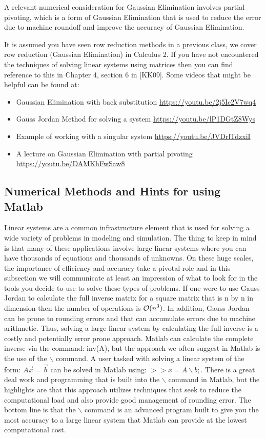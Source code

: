 \documentclass[twoside]{article}
\renewcommand{\cite}[1]{[#1]}
\def\ds{\displaystyle}
\begin{document}
A relevant numerical consideration for Gaussian Elimination involves partial pivoting, which is a form of Gaussian Elimination that is used to reduce the error due to machine roundoff and improve the accuracy of Gaussian Elimination. 

It is assumed you have seen row reduction methods in a previous class, we cover row reduction (Gaussian Elimination) in Calculus 2. If you have not encountered the techniques of solving linear systems using matrices then you can find reference to this in Chapter 4, section 6 in \cite{KK09}. Some videos that might be helpful can be found at:

\begin{itemize}
\item Gaussian Elimination with back substitution \href{https://youtu.be/2j5Ic2V7wq4}{https://youtu.be/2j5Ic2V7wq4}
\item Gauss Jordan Method for solving a system \href{ https://youtu.be/lP1DGtZ8Wys}{ https://youtu.be/lP1DGtZ8Wys}
\item Example of working with a singular system \href{https://youtu.be/JVDrlTdzxiI}{https://youtu.be/JVDrlTdzxiI}
\item A lecture on Gaussian Elimination with partial pivoting \href{https://youtu.be/DAMKhFwSaw8}{https://youtu.be/DAMKhFwSaw8}
\end{itemize}

\subsection{Numerical Methods and Hints for using Matlab}
Linear systems are a common infrastructure element that is used for solving a wide variety of problems in modeling and simulation. The thing to keep in mind is that many of these applications involve large linear systems where you can have thousands of equations and thousands of unknowns. On these huge scales, the importance of efficiency and accuracy take a pivotal role and in this subsection we will communicate at least an impression of what to look for in the tools you decide to use to solve these types of problems. If one were to use Gauss-Jordan to calculate the full inverse matrix for a square matrix that is n by n in dimension then the number of operations is $\ds {\cal O}(n^3)$. In addition, Gauss-Jordan can be prone to rounding errors and that can accumulate errors due to machine arithmetic. Thus, solving a large linear system by calculating the full inverse is a costly and potentially error prone approach. Matlab can calculate the complete inverse  via the command: inv(A), but the approach we often suggest in Matlab is the use of the $\ds \backslash$ command. A user tasked with solving a linear system of the form: $\ds A\vec x = \vec b$ can be solved in Matlab using: $\ds >> x = A\backslash b;$. There is a great deal work and programming that is built into the $\backslash$ command in Matlab, but the highlights are that this approach utilizes techniques that seek to reduce the computational load and also provide good management of rounding error. The bottom line is that the $\backslash$ command is an advanced program built to give you the most accuracy to a large linear system that Matlab can provide at the lowest computational cost. 
\end{document}
